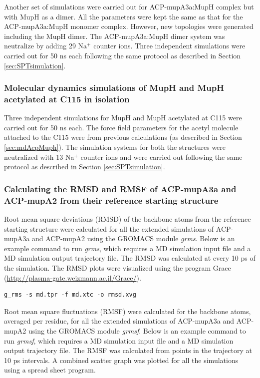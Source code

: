 			Another set of simulations were carried out for ACP-mupA3a:MupH complex but with MupH as a dimer. All the parameters were kept the same as that for the ACP-mupA3a:MupH monomer complex. However, new topologies were generated including the MupH dimer. The ACP-mupA3a:MupH dimer system was neutralize by adding 29 Na$ ^{+} $ counter ions. Three independent simulations were carried out for 50 ns each following the same protocol as described in Section  \ref{sec:SPTsimulation}.
			
			\subsubsection{Molecular dynamics simulations of MupH and MupH acetylated at C115 in isolation}
			\label{sec:muphCya}
			Three independent simulations for MupH and MupH acetylated at C115 were carried out for 50 ns each. The force field parameters for the acetyl molecule attached to the C115 were from previous calculations (as described in Section \ref{sec:mdAcpMuph}). The simulation systems for both the structures were neutralized with 13 Na$ ^{+} $ counter ions and were carried out following the same protocol as described in Section  \ref{sec:SPTsimulation}.
			
			\subsubsection{Calculating the RMSD and RMSF of ACP-mupA3a and ACP-mupA2 from their reference starting structure}
			\label{sec:RMSDstartingStructure}
			Root mean square deviations (RMSD) of the backbone atoms from the reference starting structure were calculated for all the extended simulations of ACP-mupA3a and ACP-mupA2 using the GROMACS module \textit{g\textunderscore rms}. Below is an example command to run \textit{g\textunderscore rms}, which requires a MD simulation input file and a MD simulation output trajectory file. The RMSD was calculated at every 10 ps of the simulation. The RMSD plots were visualized using the program Grace (\url{http://plasma-gate.weizmann.ac.il/Grace/}). 
			
\begin{lstlisting}
g_rms -s md.tpr -f md.xtc -o rmsd.xvg
\end{lstlisting}			
			
			Root mean square fluctuations (RMSF) were calculated for the backbone atoms, averaged per residue, for all the extended simulations of ACP-mupA3a and ACP-mupA2 using the GROMACS module  \textit{g\textunderscore rmsf}. Below is an example command to run \textit{g\textunderscore rmsf}, which requires a MD simulation input file and a MD simulation output trajectory file. The RMSF was calculated from points in the trajectory at 10 ps intervals. A combined scatter graph was plotted for all the simulations using a spread sheet program. 

